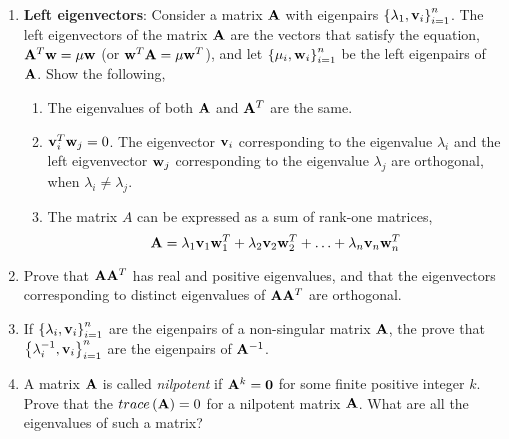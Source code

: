 \documentclass[9pt]{article}
\def\mf{\ensuremath\mathbf}
\def\lp{\ensuremath\left(}
\def\rp{\ensuremath\right)}
\def\lc{\ensuremath\left\{}
\def\rc{\ensuremath\right\}}
\begin{document}
\begin{multicols}{2}
\begin{enumerate}[resume]
     \item \textbf{Left eigenvectors}: Consider a matrix $\mf{A}$ with eigenpairs $\lc \lambda_1, \mf{v}_i\rc_{i=1}^n$. The left eigenvectors of the matrix $\mf{A}$ are the vectors that satisfy the equation, $\mf{A}^T\mf{w} = \mu \mf{w}$ (or $\mf{w}^T\mf{A} = \mu \mf{w}^T$), and let $\lc \mu_i, \mf{w}_i\rc_{i=1}^n$ be the left eigenpairs of $\mf{A}$. Show the following,
     \begin{enumerate}
         \item The eigenvalues of both $\mf{A}$ and $\mf{A}^T$ are the same.
         \item $\mf{v}_i^T\mf{w}_j = 0$. The eigenvector $\mf{v}_i$ corresponding to the eigenvalue $\lambda_i$ and the left eigvenvector $\mf{w}_j$ corresponding to the eigenvalue $\lambda_j$ are orthogonal, when $\lambda_i \neq \lambda_j$.
         \item The matrix $A$ can be expressed as a sum of rank-one matrices,
         \[ \mf{A} = \lambda_1\mf{v}_1\mf{w}_1^T + \lambda_2\mf{v}_2\mf{w}_2^T + \ldots + \lambda_n\mf{v}_n\mf{w}_n^T\]
     \end{enumerate}

     \item Prove that $\mf{A}\mf{A}^T$ has real and positive eigenvalues, and that the eigenvectors corresponding to distinct eigenvalues of $\mf{A}\mf{A}^T$ are orthogonal.

     \item If $\lc \lambda_i, \mf{v}_i\rc_{i=1}^n$ are the eigenpairs of a non-singular matrix $\mf{A}$, the prove that $\lc \lambda_i^{-1}, \mf{v}_i\rc_{i=1}^n$ are the eigenpairs of $\mf{A}^{-1}$.

     \item A matrix $\mf{A}$ is called \textit{nilpotent} if $\mf{A}^k = \mf{0}$ for some finite positive integer $k$. Prove that the $trace\lp \mf{A}\rp = 0$ for a nilpotent matrix $\mf{A}$. What are all the eigenvalues of such a matrix?

\end{enumerate}


\end{multicols}
\end{document}
